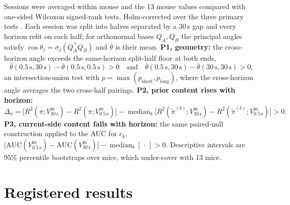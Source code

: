 \documentclass{article}
\begin{document}
Sessions were averaged within mouse and the 13 mouse values compared with one-sided Wilcoxon signed-rank tests,
Holm-corrected over the three primary tests \citep{holm1979}. Each session was split into halves separated by a 30\,s
gap and every horizon refit on each half; for orthonormal bases $Q_A, Q_B$ the principal angles satisfy
$\cos\theta_j = \sigma_j(Q_A^\top Q_B)$ and $\bar\theta$ is their mean.
\textbf{P1, geometry:} the cross-horizon angle exceeds the same-horizon split-half floor at both ends,
\begin{equation}
  \bar\theta(0.5\,\mathrm s, 30\,\mathrm s) - \bar\theta(0.5\,\mathrm s, 0.5\,\mathrm s) > 0
  \quad\text{and}\quad
  \bar\theta(0.5\,\mathrm s, 30\,\mathrm s) - \bar\theta(30\,\mathrm s, 30\,\mathrm s) > 0 ,
\end{equation}
an intersection-union test with $p = \max(p_{\mathrm{short}}, p_{\mathrm{long}})$, where the cross-horizon angle
averages the two cross-half pairings.
\textbf{P2, prior content rises with horizon:}
\begin{equation}
  \Delta_\pi = \big[R^2(\pi; V^{\mathrm{in}}_{30\,\mathrm s}) - R^2(\pi; V^{\mathrm{in}}_{0.5\,\mathrm s})\big]
  - \operatorname{median}_b \big[R^2(\tilde\pi^{(b)}; V^{\mathrm{in}}_{30\,\mathrm s}) - R^2(\tilde\pi^{(b)}; V^{\mathrm{in}}_{0.5\,\mathrm s})\big] > 0 .
  \label{eq:p2}
\end{equation}
\textbf{P3, current-side content falls with horizon:} the same paired-null construction applied to the AUC for $c_k$,
$\big[\mathrm{AUC}(V^{\mathrm{in}}_{0.5\,\mathrm s}) - \mathrm{AUC}(V^{\mathrm{in}}_{30\,\mathrm s})\big] - \operatorname{median}_b[\,\cdot\,] > 0$.
Descriptive intervals are 95\% percentile bootstraps over mice, which under-cover with 13 mice.

\section{Registered results}
\label{sec:results}
\end{document}

